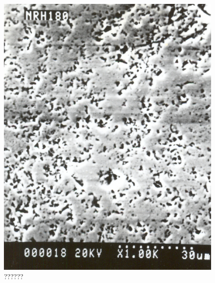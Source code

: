 \begin{figure}[H]
\renewcommand{\thefigure}{26C}
\includegraphics[scale=0.65]{images/chapter-4/fig026C.jpg}
\caption{??????}\label{chapter-4-fig26C}
\end{figure}

\newpage

